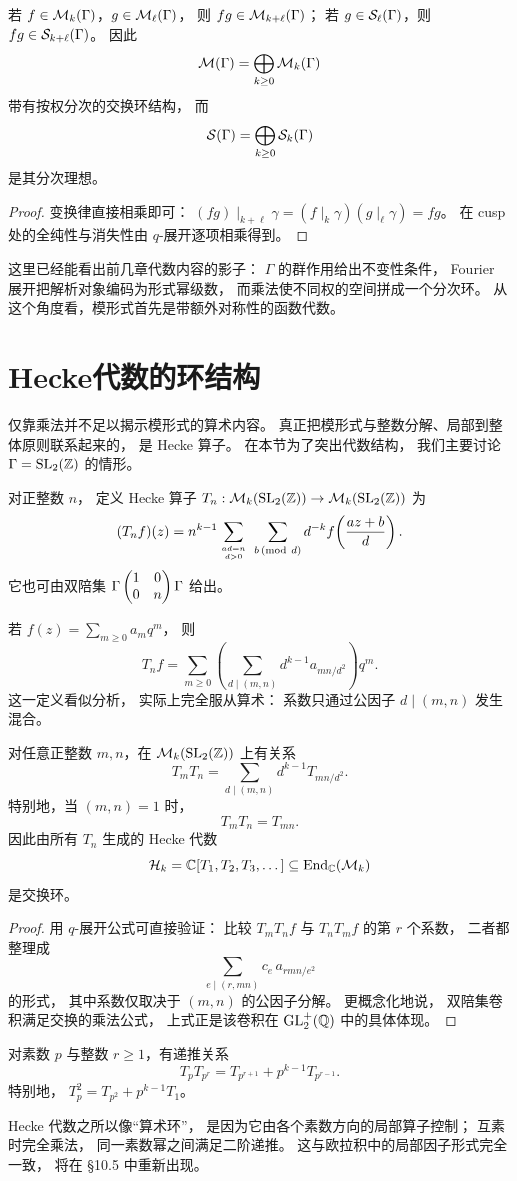 \begin{proposition}
若 $f\in \mathcal{M}_k(\Gamma)$，$g\in \mathcal{M}_\ell(\Gamma)$，
则 $fg\in \mathcal{M}_{k+\ell}(\Gamma)$；
若 $g\in \mathcal{S}_\ell(\Gamma)$，则 $fg\in \mathcal{S}_{k+\ell}(\Gamma)$。
因此
\[ \mathcal{M}(\Gamma)=\bigoplus_{k\ge 0}\mathcal{M}_k(\Gamma) \]
带有按权分次的交换环结构，
而
\[ \mathcal{S}(\Gamma)=\bigoplus_{k\ge 0}\mathcal{S}_k(\Gamma) \]
是其分次理想。
\end{proposition}
\begin{proof}
变换律直接相乘即可：
$(fg)\mid_{k+\ell}\gamma=(f\mid_k\gamma)(g\mid_\ell\gamma)=fg$。
在 cusp 处的全纯性与消失性由 $q$-展开逐项相乘得到。
\end{proof}
\begin{remark}
这里已经能看出前几章代数内容的影子：
$\Gamma$ 的群作用给出不变性条件，
Fourier 展开把解析对象编码为形式幂级数，
而乘法使不同权的空间拼成一个分次环。
从这个角度看，模形式首先是带额外对称性的函数代数。
\end{remark}
\section{Hecke代数的环结构}
仅靠乘法并不足以揭示模形式的算术内容。 真正把模形式与整数分解、局部到整体原则联系起来的， 是 Hecke 算子。 在本节为了突出代数结构， 我们主要讨论 $\Gamma=\mathrm{SL}_2(\mathbb{Z})$ 的情形。
\begin{definition}
对正整数 $n$，
定义 Hecke 算子 $T_n:\mathcal{M}_k(\mathrm{SL}_2(\mathbb{Z}))\to \mathcal{M}_k(\mathrm{SL}_2(\mathbb{Z}))$ 为
\[ (T_nf)(z)=n^{k-1}\sum_{ad=n\atop d>0}\ \sum_{b\, (\mathrm{mod}\ d)} d^{-k} f\!\left(\frac{az+b}{d}\right). \]
它也可由双陪集
$\Gamma\begin{pmatrix} 1&0\\0&n \end{pmatrix}\Gamma$
给出。
\end{definition}
若
$f(z)=\sum_{m\ge 0}a_mq^m$，
则
\[ T_nf=\sum_{m\ge 0} \left(\sum_{d\mid(m,n)} d^{k-1}a_{mn/d^2}\right)q^m. \]
这一定义看似分析，
实际上完全服从算术：
系数只通过公因子 $d\mid(m,n)$ 发生混合。
\begin{theorem}
对任意正整数 $m,n$，在 $\mathcal{M}_k(\mathrm{SL}_2(\mathbb{Z}))$ 上有关系
\[ T_mT_n=\sum_{d\mid(m,n)} d^{k-1}T_{mn/d^2}. \]
特别地，当 $(m,n)=1$ 时，
\[ T_mT_n=T_{mn}. \]
因此由所有 $T_n$ 生成的 Hecke 代数
\[ \mathcal{H}_k=\mathbb{C}[T_1,T_2,T_3,\dots]\subseteq \mathrm{End}_{\mathbb{C}}(\mathcal{M}_k) \]
是交换环。
\end{theorem}
\begin{proof}
用 $q$-展开公式可直接验证：
比较 $T_mT_n f$ 与 $T_nT_m f$ 的第 $r$ 个系数，
二者都整理成
\[ \sum_{e\mid(r,mn)} c_e\, a_{rmn/e^2} \]
的形式，
其中系数仅取决于 $(m,n)$ 的公因子分解。
更概念化地说，
双陪集卷积满足交换的乘法公式，
上式正是该卷积在 $\mathrm{GL}_2^+(\mathbb{Q})$ 中的具体体现。
\end{proof}
\begin{corollary}
对素数 $p$ 与整数 $r\ge 1$，有递推关系
\[ T_pT_{p^r}=T_{p^{r+1}}+p^{k-1}T_{p^{r-1}}. \]
特别地，
$T_p^2=T_{p^2}+p^{k-1}T_1$。
\end{corollary}
Hecke 代数之所以像“算术环”， 是因为它由各个素数方向的局部算子控制； 互素时完全乘法， 同一素数幂之间满足二阶递推。 这与欧拉积中的局部因子形式完全一致， 将在 \S10.5 中重新出现。
